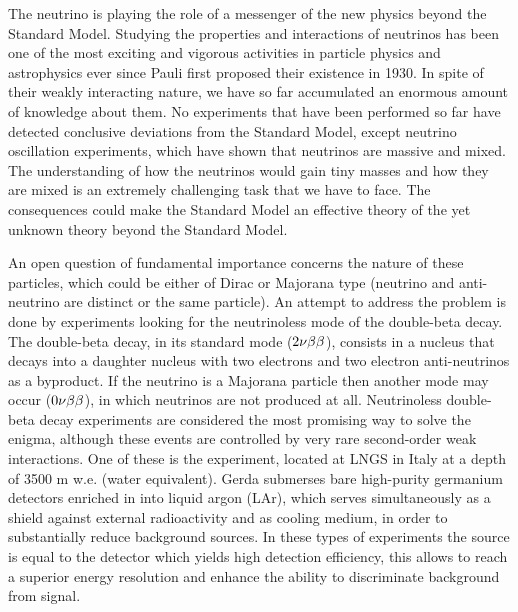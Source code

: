 	The neutrino is playing the role of a messenger of the new physics beyond the Standard Model. Studying the properties and interactions of neutrinos has been one of the most exciting and vigorous activities in particle physics and astrophysics ever since Pauli first proposed their existence in 1930. In spite of their weakly interacting nature, we have so far accumulated an enormous amount of knowledge about them. No experiments that have been performed so far have detected conclusive deviations from the Standard Model, except neutrino oscillation experiments, which have shown that neutrinos are massive and mixed. The understanding of how the neutrinos would gain tiny masses and how they are mixed is an extremely challenging task that we have to face. The consequences could make the Standard Model an effective theory of the yet unknown theory beyond the Standard Model.

	An open question of fundamental importance concerns the nature of these particles, which could be either of Dirac or Majorana type (neutrino and anti-neutrino are distinct or the same particle). An attempt to address the problem is done by experiments looking for the neutrinoless mode of the double-beta decay. The double-beta decay, in its standard mode ($2\nu\beta\beta$), consists in a nucleus that decays into a daughter nucleus with two electrons and two electron anti-neutrinos as a byproduct. If the neutrino is a Majorana particle then another mode may occur ($0\nu\beta\beta$), in which neutrinos are not produced at all. Neutrinoless double-beta decay experiments are considered the most promising way to solve the enigma, although these events are controlled by very rare second-order weak interactions. One of these is the {\gerda} experiment, located at LNGS in Italy at a depth of 3500 m w.e. (water equivalent). Gerda submerses bare high-purity germanium detectors enriched in  into liquid argon (LAr), which serves simultaneously as a shield against external radioactivity and as cooling medium, in order to substantially reduce background sources. In these types of experiments the source is equal to the detector which yields high detection efficiency, this allows to reach a superior energy resolution and enhance the ability to discriminate background from signal.

